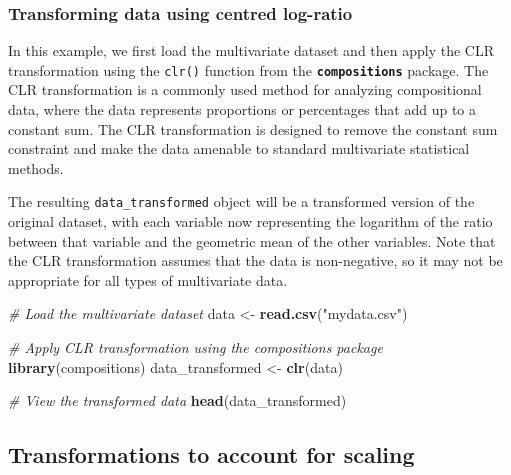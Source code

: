\documentclass[
]{book}
\newenvironment{Shaded}{\begin{snugshade}}{\end{snugshade}}
\newcommand{\CommentTok}[1]{\textcolor[rgb]{0.56,0.35,0.01}{\textit{#1}}}
\newcommand{\FunctionTok}[1]{\textcolor[rgb]{0.13,0.29,0.53}{\textbf{#1}}}
\newcommand{\NormalTok}[1]{#1}
\newcommand{\OtherTok}[1]{\textcolor[rgb]{0.56,0.35,0.01}{#1}}
\newcommand{\StringTok}[1]{\textcolor[rgb]{0.31,0.60,0.02}{#1}}
\begin{document}
\hypertarget{transforming-data-using-centred-log-ratio}{%
\subsubsection*{Transforming data using centred log-ratio}\label{transforming-data-using-centred-log-ratio}}

In this example, we first load the multivariate dataset and then apply the CLR transformation using the \texttt{clr()} function from the \textbf{\texttt{compositions}} package. The CLR transformation is a commonly used method for analyzing compositional data, where the data represents proportions or percentages that add up to a constant sum. The CLR transformation is designed to remove the constant sum constraint and make the data amenable to standard multivariate statistical methods.

The resulting \texttt{data\_transformed} object will be a transformed version of the original dataset, with each variable now representing the logarithm of the ratio between that variable and the geometric mean of the other variables. Note that the CLR transformation assumes that the data is non-negative, so it may not be appropriate for all types of multivariate data.

\small

\begin{Shaded}
\begin{Highlighting}[]
\CommentTok{\# Load the multivariate dataset}
\NormalTok{data }\OtherTok{\textless{}{-}} \FunctionTok{read.csv}\NormalTok{(}\StringTok{"mydata.csv"}\NormalTok{)}

\CommentTok{\# Apply CLR transformation using the compositions package}
\FunctionTok{library}\NormalTok{(compositions)}
\NormalTok{data\_transformed }\OtherTok{\textless{}{-}} \FunctionTok{clr}\NormalTok{(data)}

\CommentTok{\# View the transformed data}
\FunctionTok{head}\NormalTok{(data\_transformed)}
\end{Highlighting}
\end{Shaded}

\normalsize

\hypertarget{data-transformation-scaling}{%
\subsection{Transformations to account for scaling}\label{data-transformation-scaling}}
\end{document}
